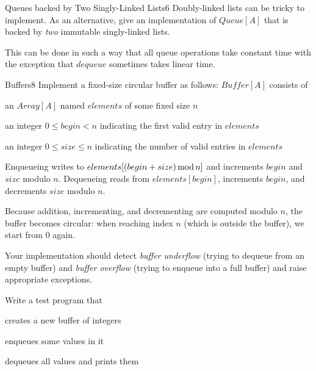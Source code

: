 \documentclass[a4paper]{article}
\begin{document}
\begin{problem}{Queues backed by Two Singly-Linked Lists}{6}
Doubly-linked lists can be tricky to implement.
As an alternative, give an implementation of $Queue[A]$ that is backed by \emph{two} immutable singly-linked lists.

This can be done in such a way that all queue operations take constant time with the exception that $dequeue$ sometimes takes linear time.

\end{problem}

\begin{problem}{Buffers}{8}
Implement a fixed-size circular buffer as follows: $\mathit{Buffer}[A]$ consists of
\begin{compactitem}
 \item an $Array[A]$ named $elements$ of some fixed size $n$
 \item an integer $0\leq begin <n$ indicating the first valid entry in $elements$
 \item an integer $0\leq size\leq n$ indicating the number of valid entries in $elements$
\end{compactitem}
Enqueueing writes to $elements[(begin+size)\mathop{\mathrm{mod}} n]$ and increments $begin$ and $size$ modulo $n$.
Dequeueing reads from $elements[begin]$, increments $begin$, and decrements $size$ modulo $n$.

Because addition, incrementing, and decrementing are computed modulo $n$, the buffer becomes circular: when reaching index $n$ (which is outside the buffer), we start from $0$ again.

Your implementation should detect \emph{buffer underflow} (trying to dequeue from an empty buffer) and \emph{buffer overflow} (trying to enqueue into a full buffer) and raise appropriate exceptions.

Write a test program that
\begin{compactitem}
 \item creates a new buffer of integers
 \item enqueues some values in it
 \item dequeues all values and prints them
\end{compactitem}
\end{problem}
\end{document}
